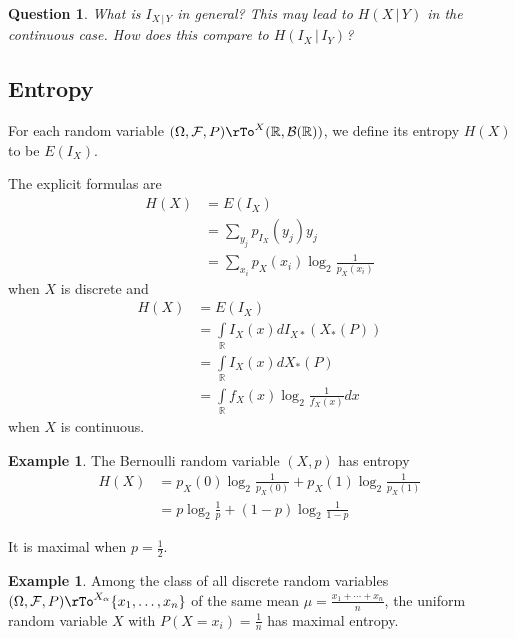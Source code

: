 \documentclass[12pt]{amsart}
\newtheorem{question}[theorem]{Question}
\theoremstyle{definition}
\newtheorem{example}[theorem]{Example}
\begin{document}
\begin{question} What is $I_{X \,|\, Y}$ in general? This may lead to $H(X \,|\, Y)$ in the continuous case. How does this compare to $H(I_X \,|\, I_Y)$?
\end{question}

\subsection{Entropy}
\dfn For each random variable $(\Omega, \mathcal{F}, P) \rTo^X (\mathbb{R}, \mathcal{B}(\mathbb{R}))$, we define its entropy $H(X)$ to be $E(I_X)$.

The explicit formulas are
\begin{align*}
H(X) & = E(I_X) \\
 & = \sum\limits_{y_j} p_{I_X}(y_j) y_j \\
 & = \sum\limits_{x_i} p_X(x_i) \log_2 \frac{1}{p_X(x_i)}
\end{align*}
when $X$ is discrete and
\begin{align*}
H(X) & =  E(I_X) \\
 & = \int\limits_{\mathbb{R}} I_X(x) dI_{X*}(X_*(P)) \\
 & = \int\limits_{\mathbb{R}} I_X(x) dX_*(P) \\
 & = \int\limits_{\mathbb{R}} f_X(x) \log_2 \frac{1}{f_X(x)} dx
\end{align*}
when $X$ is continuous.

\begin{example} The Bernoulli random variable $(X, p)$ has entropy
\begin{align*}
H(X) & = p_X(0) \log_2 \frac{1}{p_X(0)} + p_X(1) \log_2 \frac{1}{p_X(1)} \\
 & = p \log_2 \frac{1}{p} + (1 - p) \log_2 \frac{1}{1 - p}
\end{align*}

It is maximal when $p = \frac{1}{2}$.
\end{example}

\begin{example} Among the class of all discrete random variables $(\Omega, \mathcal{F}, P) \rTo^{X_{\alpha}} \{x_1, \dots , x_n\}$ of the same mean $\mu = \frac{x_1 + \cdots + x_n}{n}$, the uniform random variable $X$ with $P(X = x_i) = \frac{1}{n}$ has maximal entropy.
\end{example}
\end{document}
